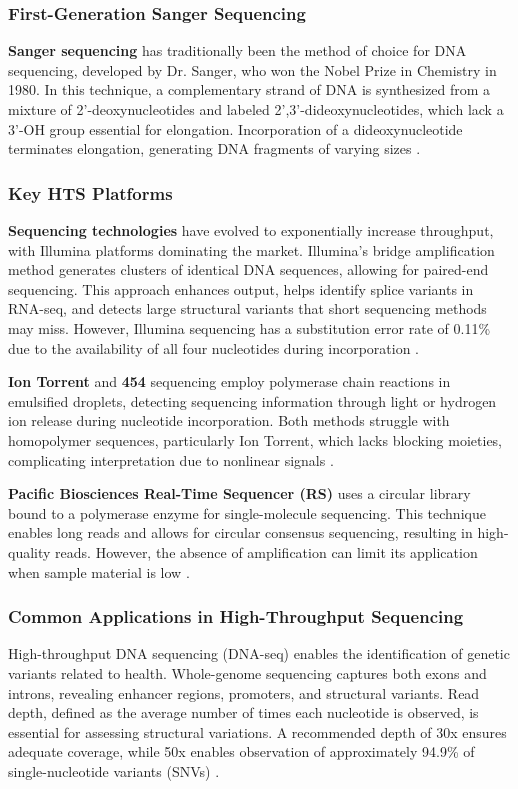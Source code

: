 \subsubsection{First-Generation Sanger Sequencing} 
\textbf{Sanger sequencing} has traditionally been the method of choice for DNA sequencing, developed by Dr. Sanger, who won the Nobel Prize in Chemistry in 1980. In this technique, a complementary strand of DNA is synthesized from a mixture of 2'-deoxynucleotides and labeled 2',3'-dideoxynucleotides, which lack a 3'-OH group essential for elongation. Incorporation of a dideoxynucleotide terminates elongation, generating DNA fragments of varying sizes \cite*{L5-HighThroughput}.

\subsubsection{Key HTS Platforms} 
\textbf{Sequencing technologies} have evolved to exponentially increase throughput, with Illumina platforms dominating the market. Illumina's bridge amplification method generates clusters of identical DNA sequences, allowing for paired-end sequencing. This approach enhances output, helps identify splice variants in RNA-seq, and detects large structural variants that short sequencing methods may miss. However, Illumina sequencing has a substitution error rate of 0.11\% due to the availability of all four nucleotides during incorporation  \cite*{L5-HighThroughput}.

\textbf{Ion Torrent} and \textbf{454} sequencing employ polymerase chain reactions in emulsified droplets, detecting sequencing information through light or hydrogen ion release during nucleotide incorporation. Both methods struggle with homopolymer sequences, particularly Ion Torrent, which lacks blocking moieties, complicating interpretation due to nonlinear signals  \cite*{L5-HighThroughput}.

\textbf{Pacific Biosciences Real-Time Sequencer (RS)} uses a circular library bound to a polymerase enzyme for single-molecule sequencing. This technique enables long reads and allows for circular consensus sequencing, resulting in high-quality reads. However, the absence of amplification can limit its application when sample material is low  \cite*{L5-HighThroughput}.

\subsubsection{Common Applications in High-Throughput Sequencing}
High-throughput DNA sequencing (DNA-seq) enables the identification of genetic variants related to health. Whole-genome sequencing captures both exons and introns, revealing enhancer regions, promoters, and structural variants. Read depth, defined as the average number of times each nucleotide is observed, is essential for assessing structural variations. A recommended depth of 30x ensures adequate coverage, while 50x enables observation of approximately 94.9\% of single-nucleotide variants (SNVs) \cite*{L5-HighThroughput}.

